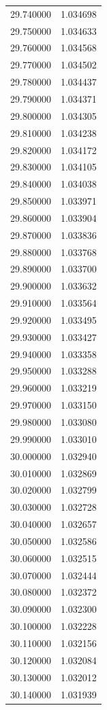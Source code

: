 \begin{tabular}{rr}
29.740000 & 1.034698 \\
29.750000 & 1.034633 \\
29.760000 & 1.034568 \\
29.770000 & 1.034502 \\
29.780000 & 1.034437 \\
29.790000 & 1.034371 \\
29.800000 & 1.034305 \\
29.810000 & 1.034238 \\
29.820000 & 1.034172 \\
29.830000 & 1.034105 \\
29.840000 & 1.034038 \\
29.850000 & 1.033971 \\
29.860000 & 1.033904 \\
29.870000 & 1.033836 \\
29.880000 & 1.033768 \\
29.890000 & 1.033700 \\
29.900000 & 1.033632 \\
29.910000 & 1.033564 \\
29.920000 & 1.033495 \\
29.930000 & 1.033427 \\
29.940000 & 1.033358 \\
29.950000 & 1.033288 \\
29.960000 & 1.033219 \\
29.970000 & 1.033150 \\
29.980000 & 1.033080 \\
29.990000 & 1.033010 \\
30.000000 & 1.032940 \\
30.010000 & 1.032869 \\
30.020000 & 1.032799 \\
30.030000 & 1.032728 \\
30.040000 & 1.032657 \\
30.050000 & 1.032586 \\
30.060000 & 1.032515 \\
30.070000 & 1.032444 \\
30.080000 & 1.032372 \\
30.090000 & 1.032300 \\
30.100000 & 1.032228 \\
30.110000 & 1.032156 \\
30.120000 & 1.032084 \\
30.130000 & 1.032012 \\
30.140000 & 1.031939 \\

\end{tabular}

